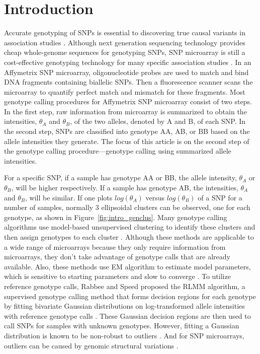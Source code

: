\documentclass{scrartcl}
\begin{document}
\section{Introduction}

\par
Accurate genotyping of SNPs is essential to discovering true causal variants
in association studies \cite{gordon2005}.
Although next generation sequencing technology provides cheap whole-genome
sequences for genotyping SNPs, SNP microarray is still a cost-effective
genotyping technology for many specific association studies \cite{rho2010}.
In an Affymetrix SNP microarray, oligonucleotide probes are used to match and
bind DNA fragments containing biallelic SNPs.
Then a fluorescence scanner scans the microarray to quantify perfect 
match and mismatch for these fragments.
Most genotype calling procedures for Affymetrix SNP microarray consist of
two steps.
In the first step, raw information from microarray is summarized to obtain
the intensities, $\theta_A$ and $\theta_B$, of the two alleles, denoted
by A and B, of each SNP.
In the second step, SNPs are classified into genotype AA, AB, or BB based on
the allele intensities they generate.
The focus of this article is on the second step of the genotype calling
procedure---genotype calling using summarized allele intensities.

\par
For a specific SNP, if a sample has genotype AA or BB, the allele intensity,
$\theta_A$ or $\theta_B$, will be higher respectively. 
If a sample has genotype AB, the intensities, $\theta_A$ and $\theta_B$,
will be similar.
If one plots $log(\theta_A)$ versus $log(\theta_B)$ of a SNP for a number of
samples, normally 3 ellipsoidal clusters can be observed, one for each
genotype, as shown in Figure~\ref{fig:intro_genclus}.
Many genotype calling algorithms use model-based unsupervised clustering
to identify these clusters and then assign genotypes to each cluster 
\cite{norlen2008,lin2008,fujisawa2004}.
Although these methods are applicable to a wide range of microarrays because
they only require information from microarrays, they don't take advantage of
genotype calls that are already available.
Also, these methods use EM algorithm to estimate model parameters, which is
sensitive to starting parameters and slow to converge \cite{wu1983}.
To utilize reference genotype calls, Rabbee and Speed proposed the RLMM
algorithm, a supervised genotype calling method that forms
decision regions for each genotype by fitting bivariate Gaussian
distributions on log-transformed allele intensities with reference
genotype calls \cite{rabbee2005}.
These Gaussian decision regions are then used to call SNPs for samples with
unknown genotypes.
However, fitting a Gaussian distribution is known to be non-robust to outliers 
\cite{huber1981}.
And for SNP microarrays, outliers can be caused by genomic structural
variations \cite{marioni2007}.
\end{document}
